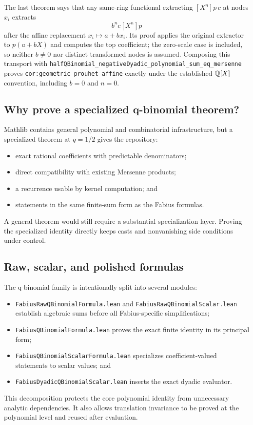 \documentclass[11pt,oneside]{article}
\theoremstyle{definition}
\theoremstyle{remark}
\begin{document}
The last theorem says that any same-ring functional extracting
\([X^n]p\,c\) at nodes \(x_i\) extracts
\[
 b^n c[X^n]p
\]
after the affine replacement \(x_i\mapsto a+b x_i\).  Its proof applies the
original extractor to \(p(a+bX)\) and computes the top coefficient; the
zero-scale case is included, so neither \(b\ne0\) nor distinct transformed
nodes is assumed.  Composing this transport with
\nolinkurl{halfQBinomial_negativeDyadic_polynomial_sum_eq_mersenne} proves
\nolinkurl{cor:geometric-prouhet-affine} exactly under the established
\(\mathbb{Q}[X]\) convention, including \(b=0\) and \(n=0\).

\subsection{Why prove a specialized q-binomial theorem?}
Mathlib contains general polynomial and combinatorial infrastructure, but a specialized theorem at \(q=1/2\) gives the repository:
\begin{itemize}
  \item exact rational coefficients with predictable denominators;
  \item direct compatibility with existing Mersenne products;
  \item a recurrence usable by kernel computation; and
  \item statements in the same finite-sum form as the Fabius formulas.
\end{itemize}
A general theorem would still require a substantial specialization layer.  Proving the specialized identity directly keeps casts and nonvanishing side conditions under control.

\subsection{Raw, scalar, and polished formulas}
The q-binomial family is intentionally split into several modules:
\begin{itemize}
  \item \nolinkurl{FabiusRawQBinomialFormula.lean} and \nolinkurl{FabiusRawQBinomialScalar.lean} establish algebraic sums before all Fabius-specific simplifications;
  \item \nolinkurl{FabiusQBinomialFormula.lean} proves the exact finite identity in its principal form;
  \item \nolinkurl{FabiusQBinomialScalarFormula.lean} specializes coefficient-valued statements to scalar values; and
  \item \nolinkurl{FabiusDyadicQBinomialScalar.lean} inserts the exact dyadic evaluator.
\end{itemize}
This decomposition protects the core polynomial identity from unnecessary analytic dependencies.  It also allows translation invariance to be proved at the polynomial level and reused after evaluation.
\end{document}
